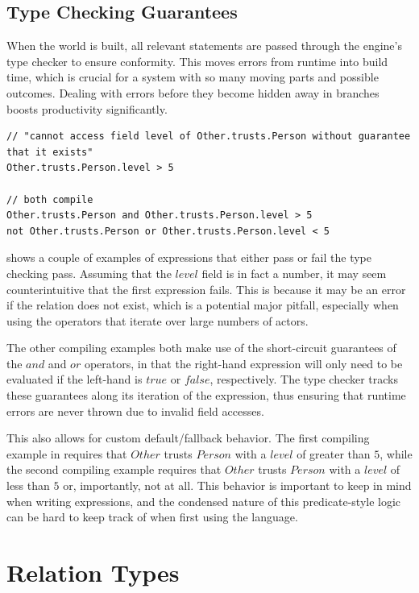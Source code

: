 \subsection{Type Checking Guarantees}

When the world is built, all relevant statements are passed through the engine's type
checker to ensure conformity. This moves errors from runtime into build time, which is
crucial for a system with so many moving parts and possible outcomes. Dealing with errors
before they become hidden away in branches boosts productivity significantly.

\begin{lstlisting}[float=hb, caption=Examples describing how to appease the type checker., label=lst:TypeChecking]
// "cannot access field level of Other.trusts.Person without guarantee that it exists"
Other.trusts.Person.level > 5

// both compile
Other.trusts.Person and Other.trusts.Person.level > 5
not Other.trusts.Person or Other.trusts.Person.level < 5
\end{lstlisting}

 shows a couple of examples of expressions that either pass
or fail the type checking pass. Assuming that the $level$ field is in fact a number,
it may seem counterintuitive that the first expression fails. This is because it may
be an error if the relation does not exist, which is a potential major pitfall,
especially when using the operators that iterate over large numbers of actors.

The other compiling examples both make use of the short-circuit guarantees of the $and$
and $or$ operators, in that the right-hand expression will only need to be evaluated
if the left-hand is $true$ or $false$, respectively. The type checker tracks these
guarantees along its iteration of the expression, thus ensuring that runtime errors are
never thrown due to invalid field accesses.

This also allows for custom default/fallback behavior. The first compiling example in
 requires that $Other$ trusts $Person$ with a $level$ of greater than
$5$, while the second compiling example requires that $Other$ trusts $Person$ with a $level$
of less than $5$ or, importantly, not at all. This behavior is important to keep in mind
when writing expressions, and the condensed nature of this predicate-style logic can be hard
to keep track of when first using the language.

\section{Relation Types} \label{sec:RelationTypes}

